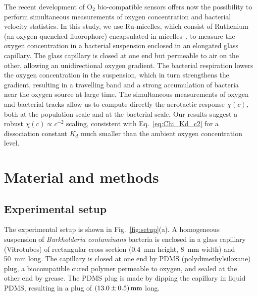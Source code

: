 \documentclass[aps,a4paper,twocolumn,10pt,pre,showpacs]{revtex4-2}
\begin{document}
The recent development of O$_2$ bio-compatible sensors offers now the possibility to perform simultaneous measurements of oxygen concentration and bacterial velocity statistics. In this study, we use Ru-micelles, which consist of Ruthenium (an oxygen-quenched fluorophore) encapsulated in micelles~\cite{douarche2009coli,Adler2012}, to measure the oxygen concentration in a bacterial suspension enclosed in an elongated glass capillary. The glass capillary is closed at one end but permeable to air on the other, allowing an unidirectional oxygen gradient. The bacterial respiration lowers the oxygen concentration in the suspension, which in turn strengthens the gradient, resulting in a travelling band and a strong accumulation of bacteria near the oxygen source at large time. The simultaneous measurements of oxygen and bacterial tracks allow us to compute directly the aerotactic response $\chi(c)$, both at the population scale and at the bacterial scale. Our results suggest a robust $\chi(c) \propto c^{-2}$ scaling, consistent with Eq.~\eqref{eq:Chi_Kd_c2} for a dissociation constant $K_d$ much smaller than the ambient oxygen concentration level.



\section{Material and methods}

\subsection{Experimental setup}
\label{sec:setup}

The experimental setup is shown in  Fig.~\ref{fig:setup}(a). A homogeneous suspension of \emph{Burkholderia contaminans} bacteria is enclosed in a glass capillary (Vitrotubes) of rectangular cross section (\SI{0.4}{\mm} height, \SI{8}{\mm} width) and \SI{50}{\mm} long. The capillary is closed at one end by PDMS (polydimethylsiloxane) plug, a biocompatible cured polymer permeable to oxygen, and sealed at the other end by grease. The PDMS plug is made by dipping the capillary in liquid PDMS, resulting in a plug of $\SI{13\pm0.5}{\mm}$ long.
\end{document}
